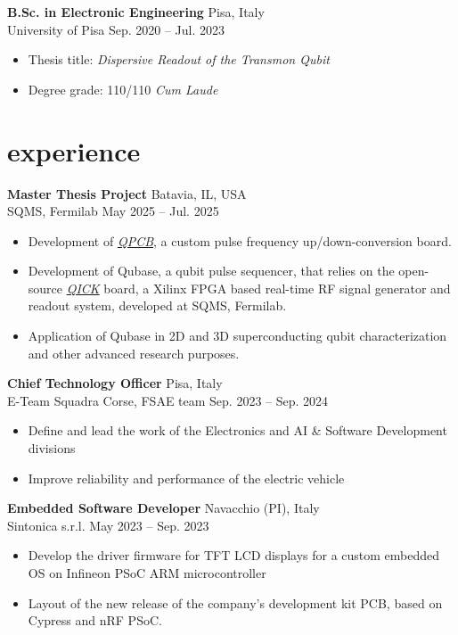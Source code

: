 \documentclass[10pt]{article}
\newcommand{\entry}[4]{{{\textbf{#1}}} \hfill #3 \\ #2 \hfill #4}
\begin{document}
\smallskip

\entry{B.Sc. in Electronic Engineering}{University of Pisa}{Pisa, Italy}{Sep. 2020 -- Jul. 2023}
\begin{itemize}[noitemsep,leftmargin=3.5mm,rightmargin=0mm,topsep=6pt]
  \item Thesis title: \textit{Dispersive Readout of  the Transmon Qubit}
  \item Degree grade: 110/110 \textit{Cum Laude}

\end{itemize}

\section{experience}

\entry{Master Thesis Project}{SQMS, Fermilab}{Batavia, IL, USA}{May 2025 -- Jul. 2025}
\begin{itemize}[noitemsep,leftmargin=3.5mm,rightmargin=0mm,topsep=6pt]
	\item Development of \textit{\href{https://github.com/leonardobove/qpcb}{QPCB}}, a custom pulse frequency up/down-conversion board.
	\item Development of Qubase, a qubit pulse sequencer, that relies on the open-source \textit{\href{https://github.com/openquantumhardware/qick}{QICK}} board, a Xilinx FPGA based real-time RF signal generator and readout system, developed at SQMS, Fermilab.
	\item Application of Qubase in 2D and 3D superconducting qubit characterization and other advanced research purposes.  
\end{itemize}

\smallskip

\entry{Chief Technology Officer}{E-Team Squadra Corse, FSAE team}{Pisa, Italy}{Sep. 2023 -- Sep. 2024}
\begin{itemize}[noitemsep,leftmargin=3.5mm,rightmargin=0mm,topsep=6pt]
    \item Define and lead the work of the Electronics and AI \& Software Development divisions
    \item Improve reliability and performance of the electric vehicle 
\end{itemize}

\smallskip

\entry{Embedded Software Developer}{Sintonica s.r.l.}{Navacchio (PI), Italy}{May 2023 -- Sep. 2023}
\begin{itemize}[noitemsep,leftmargin=3.5mm,rightmargin=0mm,topsep=6pt]
    \item Develop the driver firmware for TFT LCD displays for a custom embedded OS on Infineon PSoC ARM microcontroller
    \item Layout of the new release of the company's development kit PCB, based on Cypress and nRF PSoC.
\end{itemize}
\end{document}

